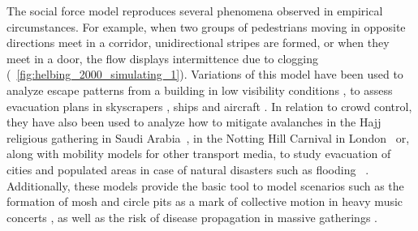 The social force model reproduces several phenomena observed in empirical circumstances. For example, when two groups of pedestrians moving in opposite directions meet in a corridor, unidirectional stripes are formed, or when they meet in a door, the flow displays intermittence due to clogging \cite{helbing_2001_self} (\figurename~\ref{fig:helbing_2000_simulating_1}). Variations of this model have been used to analyze escape patterns from a building in low visibility conditions \cite{helbing_2000_simulating, helbing_2013_pedestrian}, to assess evacuation plans in skyscrapers \cite{sikora_2012_model,parisi_2014_sequential}, ships \cite{chen_2015_modeling} and aircraft \cite{kirchner_2003_friction}. In relation to crowd control, they have also been used to analyze how to mitigate avalanches in the Hajj religious gathering in Saudi Arabia~\cite{helbing_2007_dynamics,johansson_2008_crowd}, in the Notting Hill Carnival in London~\cite{batty_2003_safety} or, along with mobility models for other transport media, to study evacuation of cities and populated areas in case of natural disasters such as flooding ~\cite{lammel_2010_representation,kunwar_2014_large,kunwar_2015_evacuation}. Additionally, these models provide the basic tool to model scenarios such as the formation of mosh and circle pits as a mark of collective motion in heavy music concerts \cite{silverberg_2013_collective}, as well as the risk of disease propagation in massive gatherings \cite{johansson_2012_crowd}.  


